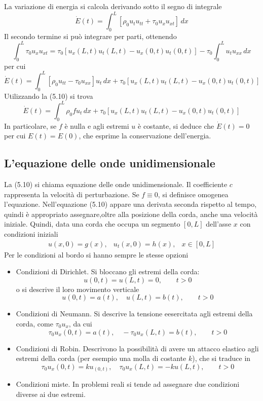 \documentclass[a4paper,12pt, draft]{article}
\theoremstyle{break}
\numberwithin{equation}{section}
\begin{document}
La variazione di energia si calcola derivando sotto il segno di integrale
\[
  \dot{E}(t) = \int_0^L [\rho_0 u_t u_{tt} + \tau_0 u_x u_{xt}] \, dx
\]
Il secondo termine si può integrare per parti, ottenendo
\[
  \int_0^L \tau_0 u_x u_{xt} = \tau_0[u_x(L, t)u_t(L, t) - u_x(0,t)u_t(0,t)] -\tau_0 \int_0^L u_t u_{xx} \, dx
\]
per cui 
\[
  \dot{E}(t) = \int_0^L [\rho_0 u_{tt} - \tau_0 u_{xx}] u_t \, dx + \tau_0[u_x(L, t)u_t(L, t) - u_x(0,t)u_t(0,t)]
\]
Utilizzando la (5.10) si trova
\begin{equation}
  \dot{E}(t) = \int_0^L \rho_0 f u_t \, dx + \tau_0[u_x(L, t)u_t(L, t) - u_x(0,t)u_t(0,t)]
\end{equation}
In particolare, se \(f\) è nulla e agli estremi \(u\) è costante, si deduce che \(\dot{E}(t) = 0\) per cui \(E(t) = E(0)\), che esprime la conservazione dell'energia.
\subsection{L'equazione delle onde unidimensionale}
La (5.10) si chiama equazione delle onde unidimensionale. Il coefficiente \(c\) rappresenta la velocità di perturbazione. Se \(f \equiv 0\), si definisce omogenea l'equazione. Nell'equazione (5.10) appare una derivata seconda rispetto al tempo, quindi è appropriato assegnare,oltre alla posizione della corda, anche una velocità iniziale. Quindi, data una corda che occupa un segmento \([0, L]\) dell'asse \(x\) con condizioni iniziali
\begin{eqnarray*}
  u(x,0) = g(x), & u_t(x,0) = h(x), & x \in [0, L]
\end{eqnarray*}
Per le condizioni al bordo si hanno sempre le stesse opzioni
\begin{itemize}
  \item Condizioni di Dirichlet. Si bloccano gli estremi della corda:
  \[
  u(0,t) = u(L,t) = 0, \qquad t>0  
  \]
  o si descrive il loro movimento verticale
  \[
    u(0,t) = a(t), \quad u(L,t) = b(t), \qquad t > 0
  \]
  \item Condizioni di Neumann. Si descrive la tensione eesercitata agli estremi della corda, come \(\tau_0u_x\), da cui
  \[
    \tau_0u_x(0,t) = a(t), \quad -\tau_0u_x(L,t) = b(t), \qquad t > 0
  \]
  \item Condizioni di Robin. Descrivono la possibilità di avere un attacco elastico agli estremi della corda (per esempio una molla di costante \(k\)), che si traduce in 
  \[
    \tau_0u_x(0,t) = ku_(0,t), \quad \tau_0u_x(L,t) = -ku(L,t), \qquad t > 0
  \]
  \item Condizioni miste. In problemi reali si tende ad assegnare due condizioni diverse ai due estremi.
\end{itemize}
\end{document}

